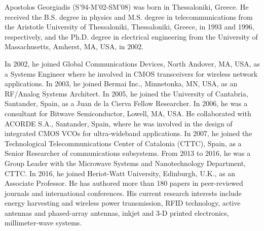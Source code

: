 \documentclass[journal]{IEEEtran}
\begin{document}

\begin{IEEEbiography}
{Apostolos Georgiadis} (S'94-M'02-SM'08) was
born in Thessaloniki, Greece. He received the B.S.
degree in physics and M.S. degree in telecommunications
from the Aristotle University of Thessaloniki,
Thessaloniki, Greece, in 1993 and 1996,
respectively, and the Ph.D. degree in electrical
engineering from the University of Massachusetts,
Amherst, MA, USA, in 2002.

In 2002, he joined Global Communications
Devices, North Andover, MA, USA, as a Systems
Engineer where he involved in CMOS transceivers
for wireless network applications. In 2003, he joined Bermai Inc., Minnetonka,
MN, USA, as an RF/Analog Systems Architect. In 2005, he joined the
University of Cantabria, Santander, Spain, as a Juan de la Cierva Fellow
Researcher. In 2006, he was a consultant for Bitwave Semiconductor, Lowell,
MA, USA. He collaborated with ACORDE S.A., Santander, Spain, where
he was involved in the design of integrated CMOS VCOs for ultra-wideband
applications. In 2007, he joined the Technological Telecommunications Center
of Catalonia (CTTC), Spain, as a Senior Researcher of communications
subsystems. From 2013 to 2016, he was a Group Leader with the Microwave
Systems and Nanotechnology Department, CTTC. In 2016, he joined Heriot-Watt University, Edinburgh, U.K., as an Associate Professor. He has authored
more than 180 papers in peer-reviewed journals and international conferences.
His current research interests include energy harvesting and wireless power
transmission, RFID technology, active antennas and phased-array antennas,
inkjet and 3-D printed electronics, millimeter-wave systems.


\end{IEEEbiography}
\end{document}
